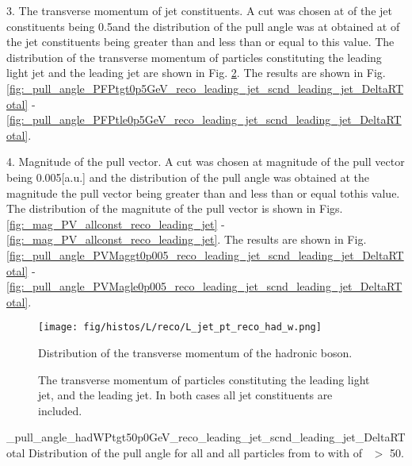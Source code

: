 3. The transverse momentum \pt of jet constituents. A cut was chosen at \pt of the jet constituents being 0.5\GeV and the distribution of the pull angle was at obtained at \pt of the jet constituents being greater than and less than or equal to this value. The distribution of the transverse momentum of particles constituting the leading light jet and the leading \cPqb jet are shown in Fig. \ref{fig:L_JetConstPT_allconst_reco}. The results are shown in Fig. \ref{fig:_pull_angle_PFPtgt0p5GeV_reco_leading_jet_scnd_leading_jet_DeltaRTotal} - \ref{fig:_pull_angle_PFPtle0p5GeV_reco_leading_jet_scnd_leading_jet_DeltaRTotal}.

4. Magnitude of the pull vector.  A cut was chosen at magnitude of the pull vector being 0.005[a.u.] and the distribution of the pull angle was obtained at the magnitude the pull vector being greater than and less than or equal tothis value. The distribution of the magnitute of the pull vector is shown in Figs. \ref{fig:_mag_PV_allconst_reco_leading_jet} - \ref{fig:_mag_PV_allconst_reco_leading_jet}. The results are shown in Fig. \ref{fig:_pull_angle_PVMaggt0p005_reco_leading_jet_scnd_leading_jet_DeltaRTotal} - \ref{fig:_pull_angle_PVMagle0p005_reco_leading_jet_scnd_leading_jet_DeltaRTotal}.

\begin{figure}
\centering
\texttt{[image: fig/histos/L/reco/L\_jet\_pt\_reco\_had\_w.png]}
\caption{Distribution of the transverse momentum \pt of the hadronic \PW boson.}
\label{fig:L_jet_pt_reco_had_w}
\end{figure}

\begin{figure}[hbtp]
    \centering
        \def\twidth{0.45}
\caption{The transverse momentum \pt of particles constituting the leading light jet, and the leading \cPqb jet. In both cases all jet constituents are included.}
\label{fig:L_JetConstPT_allconst_reco}

\end{figure}

     {_pull_angle_hadWPtgt50p0GeV_reco_leading_jet_scnd_leading_jet_DeltaRTotal}
     {Distribution of the pull angle for all \DeltaR and all particles from \leadingjet to \scndleadingjet with \pt of \PW\ $>$ 50\GeV.}

